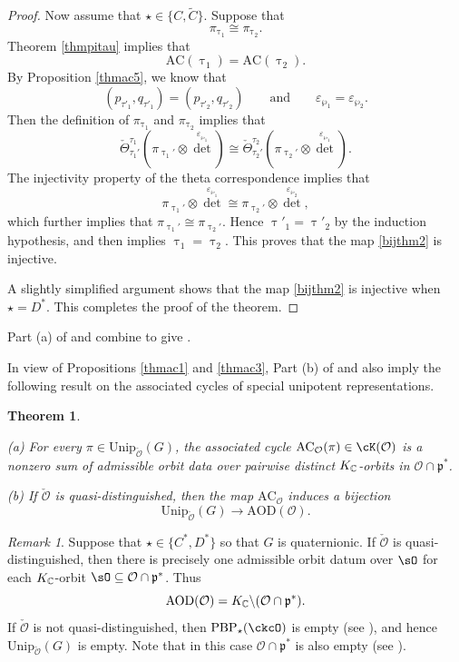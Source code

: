 \documentclass[11pt,a4paper]{amsart}
\newcommand{\CO}{{\mathcal {O}}}
\newcommand{\p}{\mathfrak p}
\numberwithin{equation}{section}
\newtheorem{thm}{Theorem}[section]
\theoremstyle{remark}
\newtheorem*{remark}{Remark}
\def\subset{\subseteq}
\def\PBP{\mathrm{PBP}}
\begin{document}
\begin{proof}
Now assume that $\star\in \{C,\widetilde C\}$. Suppose that
\[
  \pi_{\uptau_1}\cong \pi_{\uptau_2}.
\]
Theorem \ref{thmpitau} implies that
\[
\mathrm{AC}(\uptau_1)=\mathrm{AC}(\uptau_2).
\]
By Proposition \ref{thmac5}, we know that
\[
 ( p_{\tau'_1}, q_{\tau'_1})=( p_{\tau'_2}, q_{\tau'_2})\qquad\textrm{and}\qquad \varepsilon_{\wp_1}=\varepsilon_{\wp_2}.
\]
Then the definition of $ \pi_{\uptau_1}$ and $ \pi_{\uptau_2}$ implies that
\[
  \check \Theta_{\tau_1'}^{\tau_1}(\pi_{\uptau_1'}\otimes {\det}^{\varepsilon_{\wp_1}})\cong \check \Theta_{\tau_2'}^{\tau_2}(\pi_{\uptau_2'}\otimes {\det}^{\varepsilon_{\wp_1}}).
\]
The injectivity property of the theta correspondence implies that
\[
\pi_{\uptau_1'}\otimes {\det}^{\varepsilon_{\wp_1}}\cong \pi_{\uptau_2'}\otimes {\det}^{\varepsilon_{\wp_2}},
\]
which further implies that $\pi_{\uptau_1'}\cong \pi_{\uptau_2'}$.
Hence $\uptau'_1=\uptau'_2$ by the induction hypothesis, and  then implies $\uptau_1=\uptau_2$. This proves that the map \eqref{bijthm2} is injective.

A slightly simplified argument shows that the map \eqref{bijthm2} is injective when $\star=D^*$. This completes the proof of the theorem.
\end{proof}

Part (a) of  and  combine to give
.


In view of Propositions \ref{thmac1} and \ref{thmac3},
Part (b) of   and  also imply the following result on the associated cycles of special unipotent representations.


\begin{thm}\label{thmac0}

\noindent (a) For every $\pi\in \mathrm{Unip}_{\check \CO}(G)$, the associated cycle $\mathrm{AC}_{\CO}(\pi)\in \cK(\CO) $ is a nonzero  sum of  admissible orbit data
over pairwise distinct $K_{\mathbb{C}}$-orbits in $\CO\cap \p^*$.

\noindent  (b) If $\check \CO$ is quasi-distinguished, then the map $\mathrm{AC}_{\CO}$ induces a bijection
\[
\mathrm{Unip}_{\check \CO}(G)\rightarrow  \mathrm{AOD}(\CO).
\]

\end{thm}

\begin{remark}
Suppose that $\star\in \{C^*, D^*\}$ so that $G$ is quaternionic.
If $\check \CO$ is quasi-distinguished, then there is precisely one admissible orbit datum over  $\sO$ for each $K_{\mathbb{C}}$-orbit $\sO\subset \CO\cap \p^*$.
Thus
\[
 \mathrm{AOD}(\CO)=K_\C\backslash  (\CO\cap \p^*).
\]
If $\check \CO$ is not quasi-distinguished, then
$\PBP_\star(\ckcO)$ is empty (see ), and
hence $\mathrm{Unip}_{\check \CO}(G)$ is empty. Note that in this case $\CO\cap \p^*$ is also empty (see \cite[Theorems 9.3.4 and 9.3.5]{CM}).

\end{remark}
\end{document}
